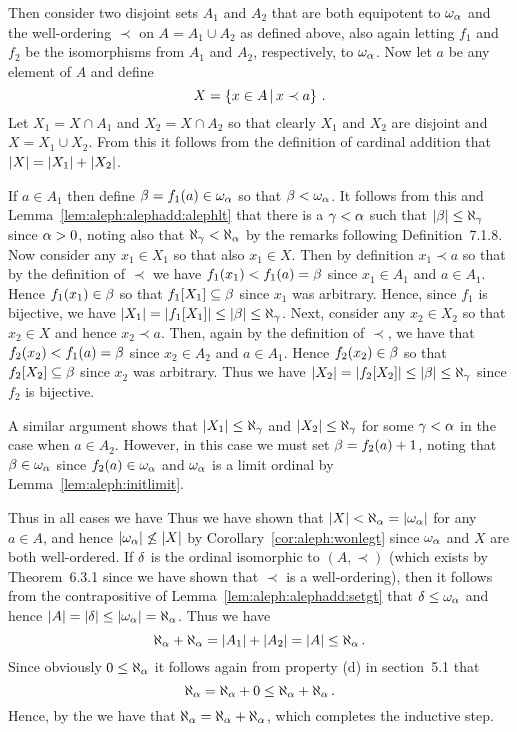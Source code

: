 {{    Then consider two disjoint sets $A_1$ and $A_2$ that are both equipotent to $\omega_\alpha$ and the well-ordering $\prec$ on $A = A_1 \cup A_2$ as defined above, also again letting $f_1$ and $f_2$ be the isomorphisms from $A_1$ and $A_2$, respectively, to $\omega_\alpha$.
    Now let $a$ be any element of $A$ and define
    $$
    X = \left\{ x \in A \,|\, x \prec a \right\} \,.
    $$
    Let $X_1 = X \cap A_1$ and $X_2 = X \cap A_2$ so that clearly $X_1$ and $X_2$ are disjoint and $X = X_1 \cup X_2$.
    From this it follows from the definition of cardinal addition that $\left| X \right| = \left| X_1 \right| + \left| X_2 \right|$.

    If $a \in A_1$ then define $\beta = f_1(a) \in \omega_\alpha$ so that $\beta < \omega_\alpha$.
    It follows from this and Lemma~\ref{lem:aleph:alephadd:alephlt} that there is a $\gamma < \alpha$ such that $\left| \beta \right| \leq \aleph_\gamma$ since $\alpha > 0$, noting also that $\aleph_\gamma < \aleph_\alpha$ by the remarks following Definition~7.1.8.
    Now consider any $x_1 \in X_1$ so that also $x_1 \in X$.
    Then by definition $x_1 \prec a$ so that by the definition of $\prec$ we have $f_1(x_1) < f_1(a) = \beta$ since $x_1 \in A_1$ and $a \in A_1$.
    Hence $f_1(x_1) \in \beta$ so that $f_1[X_1] \subseteq \beta$ since $x_1$ was arbitrary.
    Hence, since $f_1$ is bijective, we have $\left| X_1 \right| = \left| f_1[X_1] \right| \leq \left| \beta \right| \leq \aleph_\gamma$.
    Next, consider any $x_2 \in X_2$ so that $x_2 \in X$ and hence $x_2 \prec a$.
    Then, again by the definition of $\prec$, we have that $f_2(x_2) < f_1(a) = \beta$ since $x_2 \in A_2$ and $a \in A_1$.
    Hence $f_2(x_2) \in \beta$ so that $f_2[X_2] \subseteq \beta$ since $x_2$ was arbitrary.
    Thus we have $\left| X_2 \right| = \left| f_2[X_2] \right| \leq \left| \beta \right| \leq \aleph_\gamma$ since $f_2$ is bijective.

    A similar argument shows that $\left| X_1 \right| \leq \aleph_\gamma$ and $\left| X_2 \right| \leq \aleph_\gamma$ for some $\gamma < \alpha$ in the case when $a \in A_2$.
    However, in this case we must set $\beta = f_2(a) + 1$, noting that $\beta \in \omega_\alpha$ since $f_2(a) \in \omega_\alpha$ and $\omega_\alpha$ is a limit ordinal by Lemma~\ref{lem:aleph:initlimit}.

    Thus in all cases we have
    Thus we have shown that $\left| X \right| < \aleph_\alpha = \left| \omega_\alpha \right|$ for any $a \in A$, and hence $\left| \omega_\alpha \right| \not\leq \left| X \right|$ by Corollary~\ref{cor:aleph:wonlegt} since $\omega_\alpha$ and $X$ are both well-ordered.
    If $\delta$ is the ordinal isomorphic to $(A, \prec)$ (which exists by Theorem~6.3.1 since we have shown that $\prec$ is a well-ordering), then it follows from the contrapositive of Lemma~\ref{lem:aleph:alephadd:setgt} that $\delta \leq \omega_\alpha$ and hence $\left| A \right| = \left| \delta \right| \leq \left| \omega_\alpha \right| = \aleph_\alpha$.
    Thus we have
    $$
    \aleph_\alpha + \aleph_\alpha = \left| A_1 \right| + \left| A_2 \right| = \left| A \right| \leq \aleph_\alpha \,.
    $$
    Since obviously $0 \leq \aleph_\alpha$ it follows again from property (d) in section~5.1 that
    $$
    \aleph_\alpha = \aleph_\alpha + 0 \leq \aleph_\alpha + \aleph_\alpha \,.
    $$
    Hence, by the \cbthrm{} we have that $\aleph_\alpha = \aleph_\alpha + \aleph_\alpha$, which completes the inductive step.
  }
}

